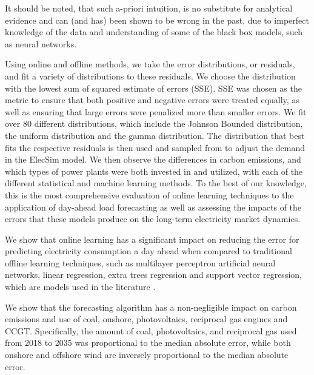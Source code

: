 \documentclass[final,3p,times,twocolumn,numbers]{elsarticle}
\begin{document}
It should be noted, that such a-priori intuition, is no substitute for analytical evidence and can (and has) been shown to be wrong in the past, due to imperfect knowledge of the data and understanding of some of the black box models, such as neural networks.



Using online and offline methods, we take the error distributions, or residuals, and fit a variety of distributions to these residuals. We choose the distribution with the lowest sum of squared estimate of errors (SSE). SSE was chosen as the metric to ensure that both positive and negative errors were treated equally, as well as ensuring that large errors were penalized more than smaller errors. We fit over 80 different distributions, which include the Johnson Bounded distribution, the uniform distribution and the gamma distribution. The distribution that best fits the respective residuals is then used and sampled from to adjust the demand in the ElecSim model. We then observe the differences in carbon emissions, and which types of power plants were both invested in and utilized, with each of the different statistical and machine learning methods. To the best of our knowledge, this is the most comprehensive evaluation of online learning techniques to the application of day-ahead load forecasting as well as assessing the impacts of the errors that these models produce on the long-term electricity market dynamics.





We show that online learning has a significant impact on reducing the error for predicting electricity consumption a day ahead when compared to traditional offline learning techniques, such as multilayer perceptron artificial neural networks, linear regression, extra trees regression and support vector regression, which are models used in the literature \cite{Lu1993, Ahmad2017, Chen2004}. %

We show that the forecasting algorithm has a non-negligible impact on carbon emissions and use of coal, onshore, photovoltaics, reciprocal gas engines and CCGT. Specifically, the amount of coal, photovoltaics, and reciprocal gas used from 2018 to 2035 was proportional to the median absolute error, while both onshore and offshore wind are inversely proportional to the median absolute error.
\end{document}
